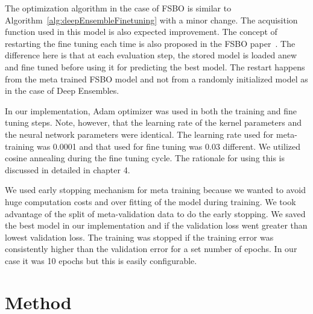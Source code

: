 \documentclass[12pt, twoside, ngerman]{report}
\begin{document}
The optimization algorithm in the case of FSBO is similar to Algorithm~\ref{alg:deepEnsembleFinetuning} with a minor change.
The acquisition function used in this model is also expected improvement.
The concept of restarting the fine tuning each time is also proposed in the FSBO paper~\cite{fsbopaper}.
The difference here is that at each evaluation step,  the stored model is loaded anew and fine tuned before using it for predicting the best model.
The restart happens from the meta trained FSBO model and not from a randomly initialized model as in the case of Deep Ensembles.

In our implementation,  Adam optimizer was used in both the training and fine tuning steps.
Note,  however,  that the learning rate of the kernel parameters and the neural network parameters were identical.
The learning rate used for meta-training was 0.0001 and that used for fine tuning was 0.03 different.
We utilized cosine annealing during the fine tuning cycle.
The rationale for using this is discussed in detailed in chapter 4.

We used early stopping mechanism for meta training because we wanted to avoid huge computation costs and over fitting of the model during training.
We took advantage of the split of meta-validation data to do the early stopping.
We saved the best model in our implementation and if the validation loss went greater than lowest validation loss.
The training was stopped if the training error was consistently higher than the validation error for a set number of epochs.
In our case it was 10 epochs but this is easily configurable.

\chapter{Method}\label{chap:ProposedIdea}
\end{document}
